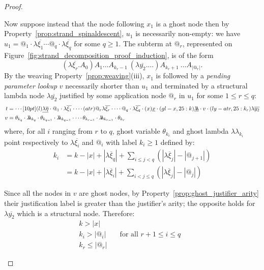 \documentclass{article}
\theoremstyle{definition}
\newcommand{\ghostlmd}{{\lambda\!\!\lambda}}
\newcommand{\ghostvar}{\theta}
\begin{document}
\begin{proof}
\begin{enumerate}
Now suppose instead that the node following $x_1$ is a ghost node then by Property~\ref{prop:strand_spinaldescent}, $u_1$ is necessarily non-empty: we have $u_1 =
@_1 \cdot\lambda\overline{\xi_1} \cdots @_q\cdot \lambda\overline{\xi_q}$ for some $q\geq 1$. The subterm at $@_r$,  represented on Figure~\ref{fig:strand_decomposition_proof_induction}, is of the form
$$(\lambda\overline{\xi_r}. A_0) A_1 \ldots A_{k_{r}-1}\ (\lambda\overline{y_2}. \ldots)A_{k_{r}+1}\ \ldots A_{|@_r|} .$$
By the weaving Property~\ref{prop:weaving}(iii), $x_1$ is followed by a \emph{pending parameter lookup} $v$ necessarily shorter than $u_1$ and terminated by a structural lambda node $\lambda\overline{y_2}$ justified by some application node $@_r$ in $u_1$ for some $1\leq r \leq q$:
\begin{align*}
 t &= \cdots \Pstr[10pt]{
(l){\underline{\lambda\overline{\eta}}} \cdot
{@_1} \cdot \lambda\overline{\xi_1} \cdot
\cdots
(atr){@_r} \lambda\overline{\xi_r} \cdot
\cdots
{@_q} \cdot\lambda\overline{\xi_q} \cdot
(x){\underline{x}}\cdot
(gl-x,25:k){\underline\ghostlmd}
\cdot v
\cdot
(ly-atr,25:k_r){\lambda\overline{y_2}}
 } \\
v &= \ghostvar_{k_q} \cdot \ghostlmd_{k_q} \cdot
\ghostvar_{k_{q-1}} \cdot \ghostlmd_{k_{q-1}} \cdot
\cdots
\ghostvar_{k_{r-1}} \cdot \ghostlmd_{k_{r-1}} \cdot
\ghostvar_{k_{r}}
\end{align*}
where, for all $i$ ranging from $r$ to $q$, ghost variable
$\ghostvar_{k_i}$ and ghost lambda $\ghostlmd_{k_i}$ point respectively to $\lambda\overline{\xi_i}$ and $@_i$ with label $k_i\geq1$ defined by:
\begin{align*}
  k_i &= k - |x| + |\lambda\overline{\xi}_q| + \sum_{i\leq j < q} (|\lambda\overline{\xi}_{j}| - |@_{j+1}|)
\\
   &= k - |x| +
  |\lambda\overline{\xi}_{i}| +
  \sum_{i< j\leq q} (|\lambda\overline{\xi}_j| - |@_j|)
\end{align*}

Since all the nodes in $v$ are ghost nodes, by Property~\ref{prop:ghost_justifier_arity} their justification label is greater than the justifier's arity; the opposite holds for $\lambda\overline{y_2}$ which is a structural node. Therefore:
\begin{align}
k > |x| \label{eqn:k_greater_than_x} \\
k_i > |@_i| & \quad\mbox{for all $r+1\leq i \leq q$ } \label{eqn:qnfdecomp_kj}\\
k_r \leq |@_r|
\end{align}



\end{enumerate}
\end{proof}
\end{document}
